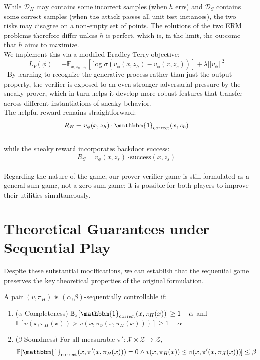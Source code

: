 While $\mathcal D_H$ may contains some incorrect samples (when $h$ errs) and $\mathcal D_S$ contains some correct samples (when the attack passes all unit test instances), the two risks may disagree on a non-empty set of points.  The solutions of the two ERM problems therefore differ unless $h$ is perfect, which is, in the limit, the outcome that $h$ aims to maximize.
\\
We implement this via a modified Bradley-Terry objective:
$$L_V(\phi) = -\mathbb{E}_{x,z_h,z_s}\left[\log \sigma(v_\phi(x, z_h) - v_\phi(x, z_s))\right] + \lambda ||v_\phi||^2$$
\noindent~By learning to recognize the generative process rather than just the output property, the verifier is exposed to an even stronger adversarial pressure by the sneaky prover, which in turn helps it develop more robust features that transfer across different instantiations of sneaky behavior.
\\
The helpful reward remains straightforward:
$$R_H = v_\phi(x, z_h) \cdot \mathbbm{1}_{\text{correct}}(x, z_h)$$
\\
while the sneaky reward incorporates backdoor success:
$$R_S = v_\phi(x, z_s) \cdot \text{success}(x, z_s)$$
\\
Regarding the nature of the game, our prover-verifier game is still formulated as a general-sum game, not a zero-sum game: it is possible for both players to improve their utilities simultaneously.

\section{Theoretical Guarantees under Sequential Play}
Despite these substantial modifications, we can establish that the sequential game preserves the key theoretical properties of the original formulation.
\begin{definition}
A pair $(v, \pi_H)$ is $(\alpha, \beta)$-sequentially controllable if:
\begin{enumerate}
    \item ($\alpha$-Completeness) $\mathbb{E}_x[\mathbbm{1}_{\text{correct}}(x, \pi_H(x))] \geq 1 - \alpha$ and $\mathbb{P}[v(x, \pi_H(x)) > v(x, \pi_S(x, \pi_H(x)))] \geq 1 - \alpha$
    \item ($\beta$-Soundness) For all measurable $\pi': \mathcal{X} \times \mathcal{Z} \to \mathcal{Z}$,
   $$\mathbb{P}[\mathbbm{1}_{\text{correct}}(x, \pi'(x, \pi_H(x))) = 0 \wedge v(x, \pi_H(x)) \leq v(x, \pi'(x, \pi_H(x)))] \leq \beta$$
\end{enumerate}
\end{definition}

